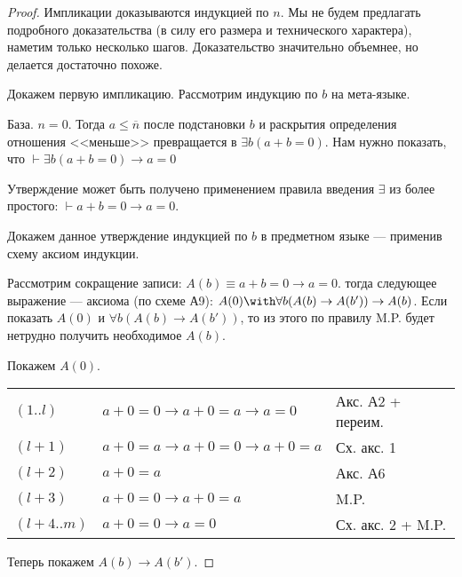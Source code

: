 \begin{proof}
Импликации доказываются индукцией по $n$. Мы не будем предлагать подробного доказательства
(в силу его размера и технического характера), наметим только несколько шагов. Доказательство
значительно объемнее, но делается достаточно похоже.

Докажем первую импликацию. Рассмотрим индукцию по $b$ на мета-языке.

База. $n=0$. Тогда $a \le \overline{n}$ после подстановки $b$ и раскрытия определения отношения <<меньше>> 
превращается в $\exists b (a + b = 0)$. 
Нам нужно показать, что $\vdash \exists b (a+b = 0) \rightarrow a=0$ 

Утверждение может быть получено применением правила введения $\exists$ из
более простого: $\vdash a + b = 0 \rightarrow a = 0$.

Докажем данное утверждение индукцией по $b$ в предметном языке --- 
применив схему аксиом индукции.

Рассмотрим сокращение записи: $A(b) \equiv a + b = 0 \rightarrow a=0$.
тогда следующее выражение --- аксиома (по схеме А9):
$A(0) \with \forall b (A(b) \rightarrow A(b')) \rightarrow A(b)$.
Если показать $A(0)$ и $\forall b (A(b) \rightarrow A(b'))$, то из
этого по правилу M.P. будет нетрудно получить необходимое $A(b)$.

Покажем $A(0)$.

\begin{tabular}{lll}
$(1..l)$ & $a + 0 = 0 \rightarrow a + 0 = a \rightarrow a = 0$ & Акс. А2 + переим.\\
$(l+1)$ & $a + 0 = a \rightarrow a + 0 = 0 \rightarrow a + 0 = a$ & Сх. акс. 1\\
$(l+2)$ & $a + 0 = a$ & Акс. А6\\
$(l+3)$ & $a + 0 = 0 \rightarrow a+0=a$ & M.P.\\
$(l+4..m)$ & $a + 0 = 0 \rightarrow a = 0$ & Сх. акс. 2 + M.P.\\
\end{tabular}

Теперь покажем $A(b)\rightarrow A(b')$. 


\end{proof}
